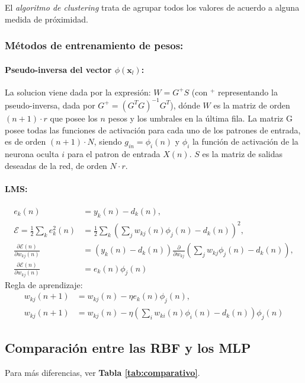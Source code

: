 \documentclass[10pt,a4paper]{article}
\begin{document}
El \textit{algoritmo de clustering} trata de agrupar todos los valores de acuerdo a alguna medida de próximidad.

\subsubsection{Métodos de entrenamiento de pesos:}
\paragraph{Pseudo-inversa del vector $\phi(\mathbf{x}_l)$:} La solucion viene dada por la expresión: $W = G^{+} S$ (con $^+$ representando la pseudo-inversa, dada por $G^+=(G^T G)^{-1}G^T$), dónde $W$ es la matriz de orden $(n+1)\cdot r$ que posee los $n$ pesos y los umbrales en la última fila. La matriz G posee todas las funciones de activación para cada uno de los patrones de entrada, es de orden $(n+1)\cdot N$, siendo $g_{in} = \phi_i(n)$ y $\phi_i$ la función de activación de la neurona oculta $i$ para el patron de entrada $X(n)$. $S$ es la matriz de salidas deseadas de la red, de orden $N\cdot r$.

\paragraph{LMS:}
\begin{align*}
e_k(n) &= y_k(n)-d_k(n) ,\\
\mathcal{E} = \frac{1}{2} \sum_k e^2_k(n) &= \frac{1}{2} \sum_k \left(\sum_j w_{kj}(n)\phi_j(n)-d_k(n)\right)^2 ,\\
\frac{\partial \mathcal{E}(n)}{\partial w_{kj}(n)} &= (y_k(n) - d_k(n))\frac{\partial}{\partial w_{kj}} \left(\sum_j w_{kj} \phi_j(n) - d_k(n)\right), \\
\frac{\partial \mathcal{E}(n)}{\partial w_{kj}(n)} &= e_k(n) \phi_j(n)
\end{align*}
Regla de aprendizaje:
\begin{align*}
w_{kj}(n+1) &= w_{kj}(n) -\eta e_k(n) \phi_j(n) ,\\
w_{kj}(n+1) &= w_{kj}(n) -\eta \left(\sum_i w_{ki}(n) \phi_i(n) - d_k(n) \right) \phi_j(n)
\end{align*}

\subsection{Comparación entre las RBF y los MLP}
Para más diferencias, ver \textbf{Tabla \ref{tab:comparativo}}.
\end{document}
